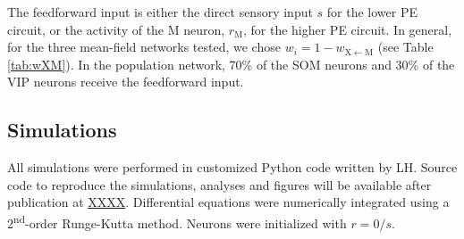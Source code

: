 \documentclass[10pt,a4paper,draft]{article}
\begin{document}
The feedforward input is either the direct sensory input $s$ for the lower PE circuit, or the activity of the M neuron, $r_\mathrm{M}$, for the higher PE circuit. In general, for the three mean-field networks tested, we chose $w_i = 1 - w_\mathrm{X\leftarrow M}$  (see Table \ref{tab:wXM}). In the population network, 70\% of the SOM neurons and 30\% of the VIP neurons receive the feedforward input.


\subsection{Simulations}
%
All simulations were performed in customized Python code written by LH. Source code to reproduce the simulations, analyses and figures will be available after publication at \url{XXXX}. Differential equations were numerically integrated using a 2\textsuperscript{nd}-order Runge-Kutta method. Neurons were initialized with $r=0/s$.
\end{document}
